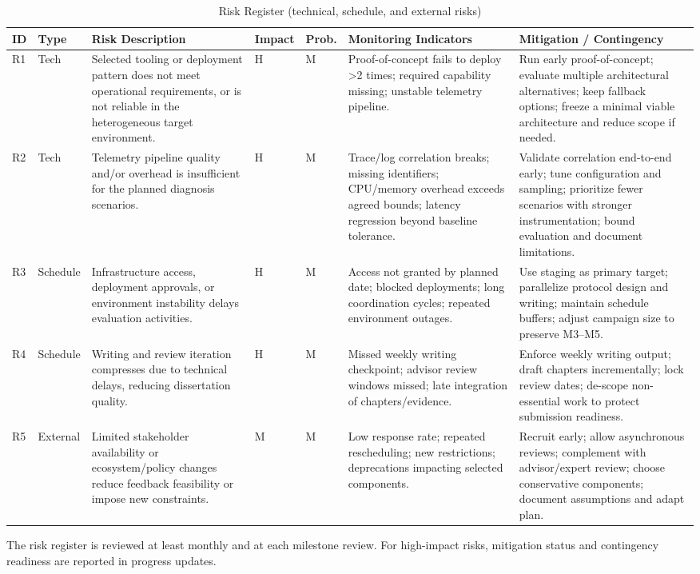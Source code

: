 \begin{table}[htbp]
\centering
\caption{Risk Register (technical, schedule, and external risks)}
\label{tab:risks}
\scriptsize
\begin{tabular}{@{}p{}p{}p{}p{}p{}p{}p{}@{}}
	\toprule
		\textbf{ID} & \textbf{Type} & \textbf{Risk Description} & \textbf{Impact} & \textbf{Prob.} & \textbf{Monitoring Indicators} & \textbf{Mitigation / Contingency} \\
\midrule
R1 & Tech & Selected tooling or deployment pattern does not meet operational requirements, or is not reliable in the heterogeneous target environment. & H & M & Proof-of-concept fails to deploy \textgreater{}2 times; required capability missing; unstable telemetry pipeline. & Run early proof-of-concept; evaluate multiple architectural alternatives; keep fallback options; freeze a minimal viable architecture and reduce scope if needed. \\
\addlinespace
R2 & Tech & Telemetry pipeline quality and/or overhead is insufficient for the planned diagnosis scenarios. & H & M & Trace/log correlation breaks; missing identifiers; CPU/memory overhead exceeds agreed bounds; latency regression beyond baseline tolerance. & Validate correlation end-to-end early; tune configuration and sampling; prioritize fewer scenarios with stronger instrumentation; bound evaluation and document limitations. \\
\addlinespace
R3 & Schedule & Infrastructure access, deployment approvals, or environment instability delays evaluation activities. & H & M & Access not granted by planned date; blocked deployments; long coordination cycles; repeated environment outages. & Use staging as primary target; parallelize protocol design and writing; maintain schedule buffers; adjust campaign size to preserve M3--M5. \\
\addlinespace
R4 & Schedule & Writing and review iteration compresses due to technical delays, reducing dissertation quality. & H & M & Missed weekly writing checkpoint; advisor review windows missed; late integration of chapters/evidence. & Enforce weekly writing output; draft chapters incrementally; lock review dates; de-scope non-essential work to protect submission readiness. \\
\addlinespace
R5 & External & Limited stakeholder availability or ecosystem/policy changes reduce feedback feasibility or impose new constraints. & M & M & Low response rate; repeated rescheduling; new restrictions; deprecations impacting selected components. & Recruit early; allow asynchronous reviews; complement with advisor/expert review; choose conservative components; document assumptions and adapt plan. \\
\bottomrule
\end{tabular}
\end{table}

The risk register is reviewed at least monthly and at each milestone review. For high-impact risks, mitigation status and contingency readiness are reported in progress updates.
